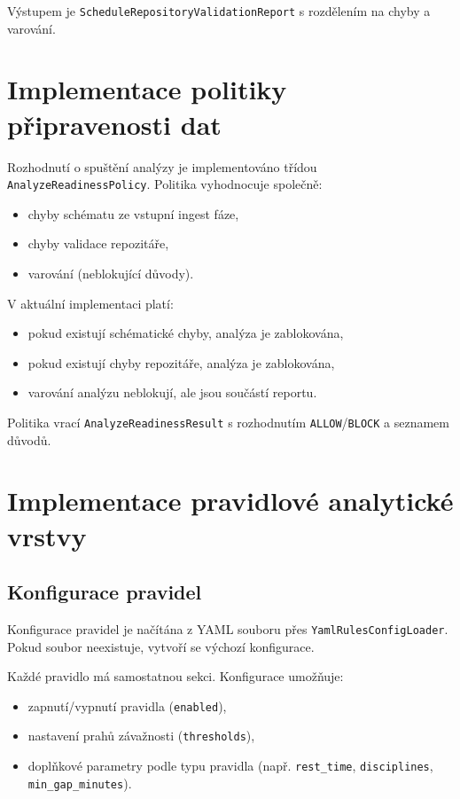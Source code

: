 \documentclass[czech, kiv, ba, he, iso690alph, pdf]{fasthesis}
\begin{document}
				Výstupem je \texttt{ScheduleRepositoryValidationReport} s rozdělením na chyby a varování.
	
		\section{Implementace politiky připravenosti dat}
			Rozhodnutí o spuštění analýzy je implementováno třídou \texttt{AnalyzeReadinessPolicy}. Politika vyhodnocuje společně:
			\begin{itemize}
				\item chyby schématu ze vstupní ingest fáze,
				\item chyby validace repozitáře,
				\item varování (neblokující důvody).
			\end{itemize}
	
			V aktuální implementaci platí:
			\begin{itemize}
				\item pokud existují schématické chyby, analýza je zablokována,
				\item pokud existují chyby repozitáře, analýza je zablokována,
				\item varování analýzu neblokují, ale jsou součástí reportu.
			\end{itemize}
	
			Politika vrací \texttt{AnalyzeReadinessResult} s rozhodnutím \texttt{ALLOW}/\texttt{BLOCK} a seznamem důvodů.
	
		\section{Implementace pravidlové analytické vrstvy}
	
			\subsection{Konfigurace pravidel}
				Konfigurace pravidel je načítána z YAML souboru přes \texttt{YamlRulesConfigLoader}. Pokud soubor neexistuje, vytvoří se výchozí konfigurace.
	
				Každé pravidlo má samostatnou sekci. Konfigurace umožňuje:
				\begin{itemize}
					\item zapnutí/vypnutí pravidla (\texttt{enabled}),
					\item nastavení prahů závažnosti (\texttt{thresholds}),
					\item doplňkové parametry podle typu pravidla (např. \texttt{rest\_time}, \texttt{disciplines}, \texttt{min\_gap\_minutes}).
				\end{itemize}
	
\end{document}
